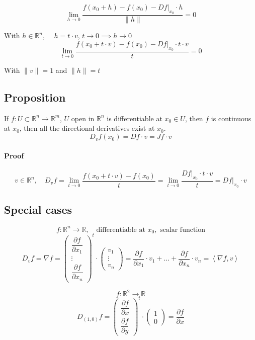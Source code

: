 \documentclass[11pt]{article}
\newcommand{\inner}[2]{\left\langle #1, #2 \right\rangle}
\begin{document}
\[
\lim_{h \to 0} \frac{f(x_0 + h) - f(x_0) - Df\big|_{x_0} \cdot h}{\| h \|} = 0
\]

With $h \in \mathbb{R}^n$, $\quad h = t \cdot v$, $t \to 0 \implies h \to 0$
\[
\lim_{t \to 0} \frac{f(x_0 + t \cdot v) - f(x_0) - Df\big|_{x_0} \cdot t \cdot v}{t} = 0
\]

With $\|v\| = 1$ and $\|h\| = t$

\subsection{Proposition}
If $f : U \subset \mathbb{R}^n \rightarrow \mathbb{R}^m$, $U$ open in $\mathbb{R}^n$ is differentiable at $x_0 \in U$, then $f$ is continuous at $x_0$, then all the directional derivatives exist at $x_0$.
\[
D_v f(x_0) = Df \cdot v = Jf \cdot v
\]

\paragraph{Proof}
\[
v \in \mathbb{R}^n, \quad D_v f = \lim_{t \to 0} \frac{f(x_0 + t \cdot v) - f(x_0)}{t} = \lim_{t \to 0} \frac{Df \big|_{x_0} \cdot t \cdot v}{t} = Df \big|_{x_0} \cdot v
\]

\subsection{Special cases}
\[
f : \mathbb{R}^n \rightarrow \mathbb{R}, \quad \text{differentiable at } x_0, \text{ scalar function}
\]
\[
D_v f = \nabla f = \begin{pmatrix}
    \dfrac{\partial f}{\partial x_1} \\
    \vdots \\
    \dfrac{\partial f}{\partial x_n}
\end{pmatrix}^t \cdot \begin{pmatrix}
    v_1 \\
    \vdots \\
    v_n
\end{pmatrix} = \dfrac{\partial f}{\partial x_1} \cdot v_1 + \ldots + \dfrac{\partial f}{\partial x_n} \cdot v_n
= \inner{\nabla f}{v}
\]

\[
f : \mathbb{R}^2 \rightarrow \mathbb{R}
\]
\[
D_{(1,0)} f = \begin{pmatrix}
    \dfrac{\partial f}{\partial x} \\
    \dfrac{\partial f}{\partial y}
\end{pmatrix}^t \cdot \begin{pmatrix}
    1 \\
    0
\end{pmatrix} = \dfrac{\partial f}{\partial x}
\]
\end{document}
